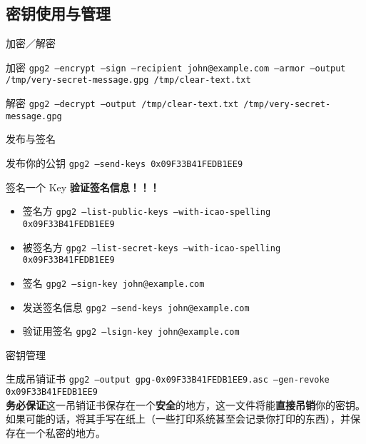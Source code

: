 \documentclass{beamer}
\begin{document}
		\subsection{密钥使用与管理}
			\begin{frame}{加密／解密}
			\begin{block}{加密}
				\texttt{gpg2 --encrypt --sign --recipient john@example.com --armor --output /tmp/very-secret-message.gpg /tmp/clear-text.txt}
			\end{block}
			\begin{block}{解密}
				\texttt{gpg2 --decrypt --output /tmp/clear-text.txt /tmp/very-secret-message.gpg}
			\end{block}
		\end{frame}
		\begin{frame}{发布与签名}
			\begin{block}{发布你的公钥}
				\texttt{gpg2 --send-keys 0x09F33B41FEDB1EE9}
			\end{block}
			\begin{block}{签名一个 Key}
				\textbf{验证签名信息！！！}
				\begin{itemize}[<+->]
					\item 签名方
					\texttt{gpg2 --list-public-keys --with-icao-spelling 0x09F33B41FEDB1EE9}
					\item 被签名方 
					\texttt{gpg2 --list-secret-keys --with-icao-spelling 0x09F33B41FEDB1EE9}
					\item 签名
					\texttt{gpg2 --sign-key john@example.com}
					\item 发送签名信息
					\texttt{gpg2 --send-keys john@example.com}
					\item 验证用签名
					\texttt{gpg2 --lsign-key john@example.com}
				\end{itemize}
			\end{block}
		\end{frame}
		\begin{frame}{密钥管理}
		\begin{block}{生成吊销证书}
			\texttt{gpg2 --output gpg-0x09F33B41FEDB1EE9.asc --gen-revoke 0x09F33B41FEDB1EE9} \\
			\textbf{务必保证}这一吊销证书保存在一个\textbf{安全}的地方，这一文件将能\textbf{直接吊销}你的密钥。如果可能的话，将其手写在纸上（一些打印系统甚至会记录你打印的东西），并保存在一个私密的地方。
		\end{block}
	\end{frame}
\end{document}
